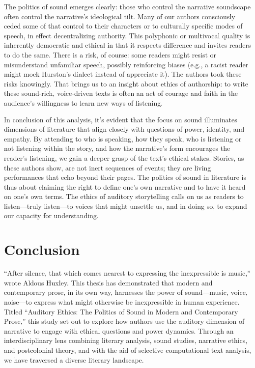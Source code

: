 \documentclass[12pt]{report}
\begin{document}
The politics of sound emerges clearly: those who control the narrative soundscape often control the narrative’s ideological tilt. Many of our authors consciously ceded some of that control to their characters or to culturally specific modes of speech, in effect decentralizing authority. This polyphonic or multivocal quality is inherently democratic and ethical in that it respects difference and invites readers to do the same. There is a risk, of course: some readers might resist or misunderstand unfamiliar speech, possibly reinforcing biases (e.g., a racist reader might mock Hurston’s dialect instead of appreciate it). The authors took these risks knowingly. That brings us to an insight about ethics of authorship: to write these sound-rich, voice-driven texts is often an act of courage and faith in the audience’s willingness to learn new ways of listening.

In conclusion of this analysis, it’s evident that the focus on sound illuminates dimensions of literature that align closely with questions of power, identity, and empathy. By attending to who is speaking, how they speak, who is listening or not listening within the story, and how the narrative’s form encourages the reader’s listening, we gain a deeper grasp of the text’s ethical stakes. Stories, as these authors show, are not inert sequences of events; they are living performances that echo beyond their pages. The politics of sound in literature is thus about claiming the right to define one’s own narrative and to have it heard on one’s own terms. The ethics of auditory storytelling calls on us as readers to listen—truly listen—to voices that might unsettle us, and in doing so, to expand our capacity for understanding.

\chapter{Conclusion}
“After silence, that which comes nearest to expressing the inexpressible is music,” wrote Aldous Huxley. This thesis has demonstrated that modern and contemporary prose, in its own way, harnesses the power of sound—music, voice, noise—to express what might otherwise be inexpressible in human experience. Titled “Auditory Ethics: The Politics of Sound in Modern and Contemporary Prose,” this study set out to explore how authors use the auditory dimension of narrative to engage with ethical questions and power dynamics. Through an interdisciplinary lens combining literary analysis, sound studies, narrative ethics, and postcolonial theory, and with the aid of selective computational text analysis, we have traversed a diverse literary landscape. 
\end{document}
